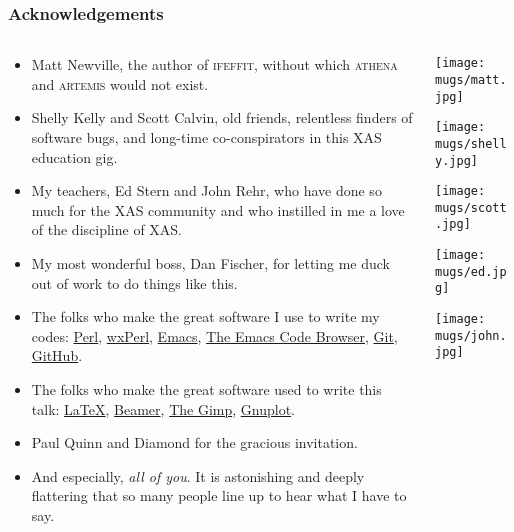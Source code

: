 \documentclass[10pt, xcolor=x11names, compress]{beamer}
\begin{document}
\begin{frame}
  \frametitle{Acknowledgements}
  \begin{columns}[T]
    \begin{column}{0.9\linewidth}
      \begin{itemize}
        \footnotesize
      \item Matt Newville, the author of \textsc{ifeffit}, without
        which \textsc{athena} and \textsc{artemis} would not exist.
      \item Shelly Kelly and Scott Calvin, old friends, relentless
        finders of software bugs, and long-time co-conspirators in
        this XAS education gig.
      \item My teachers, Ed Stern and John Rehr, who have done so much
        for the XAS community and who instilled in me a love of the
        discipline of XAS.
      \item My most wonderful boss, Dan Fischer, for letting me duck
        out of work to do things like this.
      \item The folks who make the great software I use to write my codes:
        \href{http://www.perl.org}{\color{Blue4}Perl},
        \href{http://wxperl.sourceforge.net/}{\color{Blue4}wxPerl},
        \href{http://www.gnu.org/software/emacs/}{\color{Blue4}Emacs},
        \href{http://ecb.sourceforge.net}{\color{Blue4}The Emacs Code Browser},
        \href{http://git-scm.com/}{\color{Blue4}Git},
        \href{http://github.com/}{\color{Blue4}GitHub}.
      \item The folks who make the great software used to write this talk:
        \href{http://tug.ctan.org}{\color{Blue4}\LaTeX},
        \href{http://latex-beamer.sourceforge.net}{\color{Blue4}Beamer},
        \href{http://www.gimp.org}{\color{Blue4}The Gimp},
        \href{http://www.gnuplot.info}{\color{Blue4}Gnuplot}.
      \item Paul Quinn and Diamond for the gracious invitation.
      \item And especially, \textit{all of you}.  It is astonishing and deeply
        flattering that so many people line up to hear what I have to
        say.
      \end{itemize}
    \end{column}
    \begin{column}{0.1\linewidth}
      \texttt{[image: mugs/matt.jpg]}

      \texttt{[image: mugs/shelly.jpg]}

      \texttt{[image: mugs/scott.jpg]}

      \texttt{[image: mugs/ed.jpg]}

      \texttt{[image: mugs/john.jpg]}
    \end{column}
  \end{columns}
\end{frame}
\end{document}
